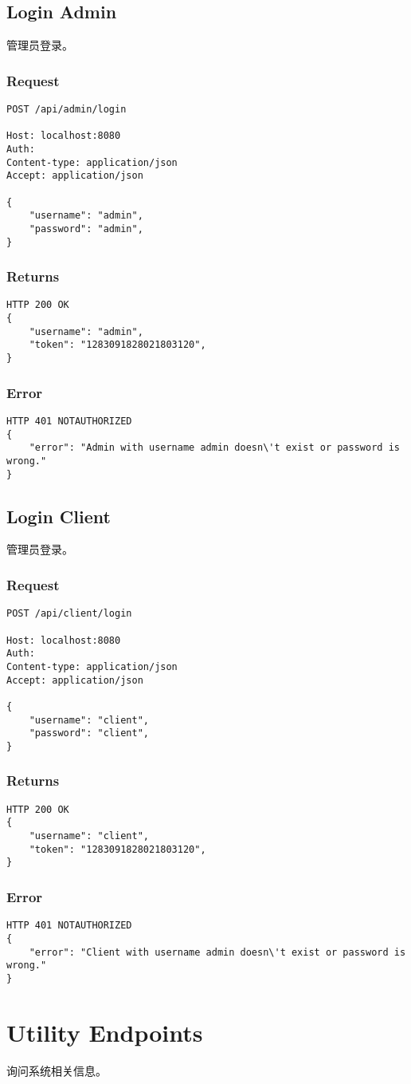 \documentclass{article}
\begin{document}
\subsection{Login Admin}
管理员登录。

\subsubsection*{Request}
\begin{lstlisting}
POST /api/admin/login

Host: localhost:8080
Auth:
Content-type: application/json
Accept: application/json

{
    "username": "admin",
    "password": "admin",
}
\end{lstlisting}

\subsubsection*{Returns}
\begin{lstlisting}
HTTP 200 OK
{
    "username": "admin",
    "token": "1283091828021803120",
}

\end{lstlisting}

\subsubsection*{Error}
\begin{lstlisting}
HTTP 401 NOTAUTHORIZED
{
    "error": "Admin with username admin doesn\'t exist or password is wrong."
}
\end{lstlisting}

\subsection{Login Client}
管理员登录。

\subsubsection*{Request}
\begin{lstlisting}
POST /api/client/login

Host: localhost:8080
Auth:
Content-type: application/json
Accept: application/json

{
    "username": "client",
    "password": "client",
}
\end{lstlisting}

\subsubsection*{Returns}
\begin{lstlisting}
HTTP 200 OK
{
    "username": "client",
    "token": "1283091828021803120",
}

\end{lstlisting}

\subsubsection*{Error}
\begin{lstlisting}
HTTP 401 NOTAUTHORIZED
{
    "error": "Client with username admin doesn\'t exist or password is wrong."
}
\end{lstlisting}

\section{Utility Endpoints}
询问系统相关信息。
\end{document}

